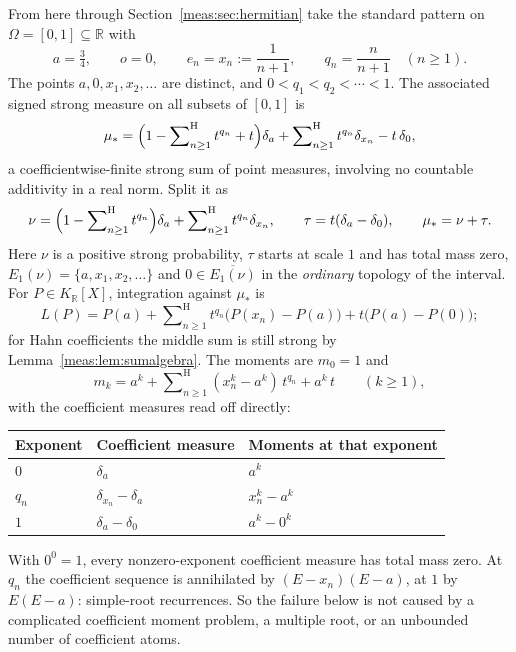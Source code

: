 \documentclass[11pt]{article}
\numberwithin{equation}{section}
\theoremstyle{definition}
\theoremstyle{remark}
\newcommand{\R}{\mathbb R}
\newcommand{\KR}{K_{\R}}
\newcommand{\hsum}{\mathop{\sum}\nolimits^{\mathrm H}}
\begin{document}
From here through Section~\ref{meas:sec:hermitian} take the standard pattern on
$\Omega=[0,1]\subseteq\R$ with
\[
 a=\tfrac34,\qquad o=0,\qquad e_n=x_n:=\frac1{n+1},\qquad q_n=\frac n{n+1}\quad(n\ge1).
\]
The points $a,0,x_1,x_2,\ldots$ are distinct, and $0<q_1<q_2<\cdots<1$. The
associated signed strong measure on all subsets of $[0,1]$ is
\begin{equation}\label{meas:eq:mustar}
 \mu_*=\Bigl(1-\hsum_{n\ge1}t^{q_n}+t\Bigr)\delta_a
 +\hsum_{n\ge1}t^{q_n}\delta_{x_n}-t\,\delta_0 ,
\end{equation}
a coefficientwise-finite strong sum of point measures, involving no countable
additivity in a real norm. Split it as
\begin{equation}\label{meas:eq:nutau}
 \nu=\Bigl(1-\hsum_{n\ge1}t^{q_n}\Bigr)\delta_a+\hsum_{n\ge1}t^{q_n}\delta_{x_n},
 \qquad \tau=t(\delta_a-\delta_0),\qquad \mu_*=\nu+\tau .
\end{equation}
Here $\nu$ is a positive strong probability, $\tau$ starts at scale $1$ and has
total mass zero, $E_1(\nu)=\{a,x_1,x_2,\ldots\}$ and $0\in\overline{E_1(\nu)}$ in
the \emph{ordinary} topology of the interval. For $P\in\KR[X]$, integration
against $\mu_*$ is
\begin{equation}\label{meas:eq:explicitL}
 L(P)=P(a)+\hsum_{n\ge1}t^{q_n}\bigl(P(x_n)-P(a)\bigr)+t\bigl(P(a)-P(0)\bigr);
\end{equation}
for Hahn coefficients the middle sum is still strong by
Lemma~\ref{meas:lem:sumalgebra}. The moments are $m_0=1$ and
\begin{equation}\label{meas:eq:mk}
 m_k=a^k+\hsum_{n\ge1}(x_n^k-a^k)\,t^{q_n}+a^k\,t\qquad(k\ge1),
\end{equation}
with the coefficient measures read off directly:
\begin{center}
\small
\begin{tabular}{@{}lll@{}}
\toprule
Exponent & Coefficient measure & Moments at that exponent\\
\midrule
$0$ & $\delta_a$ & $a^k$\\
$q_n$ & $\delta_{x_n}-\delta_a$ & $x_n^k-a^k$\\
$1$ & $\delta_a-\delta_0$ & $a^k-0^k$\\
\bottomrule
\end{tabular}
\end{center}
With $0^0=1$, every nonzero-exponent coefficient measure has total mass zero. At
$q_n$ the coefficient sequence is annihilated by $(E-x_n)(E-a)$, at $1$ by
$E(E-a)$: simple-root recurrences. So the failure below is not caused by a
complicated coefficient moment problem, a multiple root, or an unbounded
number of coefficient atoms.
\end{document}
